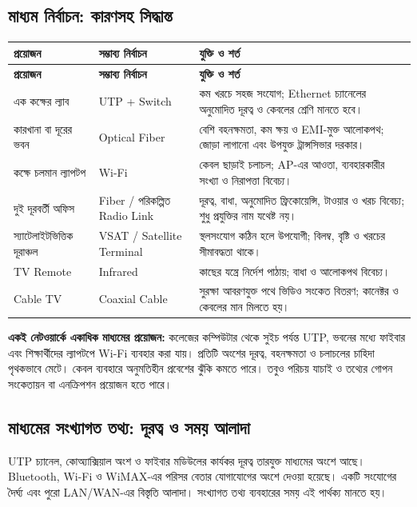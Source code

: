 \subsection{মাধ্যম নির্বাচন: কারণসহ সিদ্ধান্ত}
\begin{longtable}{|p{}|p{}|p{}|}
\hline
\textbf{প্রয়োজন} & \textbf{সম্ভাব্য নির্বাচন} & \textbf{যুক্তি ও শর্ত}\\\hline
\endfirsthead
\hline
\textbf{প্রয়োজন} & \textbf{সম্ভাব্য নির্বাচন} & \textbf{যুক্তি ও শর্ত}\\\hline
\endhead
এক কক্ষের ল্যাব & UTP + Switch & কম খরচে সহজ সংযোগ; Ethernet চ্যানেলের অনুমোদিত দূরত্ব ও কেবলের শ্রেণি মানতে হবে।\\\hline
কারখানা বা দূরের ভবন & Optical Fiber & বেশি বহনক্ষমতা, কম ক্ষয় ও EMI-মুক্ত আলোকপথ; জোড়া লাগানো এবং উপযুক্ত ট্রান্সসিভার দরকার।\\\hline
কক্ষে চলমান ল্যাপটপ & Wi-Fi & কেবল ছাড়াই চলাচল; AP-এর আওতা, ব্যবহারকারীর সংখ্যা ও নিরাপত্তা বিবেচ্য।\\\hline
দুই দূরবর্তী অফিস & Fiber / পরিকল্পিত Radio Link & দূরত্ব, বাধা, অনুমোদিত ফ্রিকোয়েন্সি, টাওয়ার ও খরচ বিবেচ্য; শুধু প্রযুক্তির নাম যথেষ্ট নয়।\\\hline
স্যাটেলাইটভিত্তিক দূরাঞ্চল & VSAT / Satellite Terminal & স্থলসংযোগ কঠিন হলে উপযোগী; বিলম্ব, বৃষ্টি ও খরচের সীমাবদ্ধতা থাকে।\\\hline
TV Remote & Infrared & কাছের যন্ত্রে নির্দেশ পাঠায়; বাধা ও আলোকপথ বিবেচ্য।\\\hline
Cable TV & Coaxial Cable & সুরক্ষা আবরণযুক্ত পথে ভিডিও সংকেত বিতরণ; কানেক্টর ও কেবলের মান মিলতে হয়।\\\hline
\end{longtable}
\textbf{একই নেটওয়ার্কে একাধিক মাধ্যমের প্রয়োজন:} কলেজের কম্পিউটার থেকে সুইচ পর্যন্ত UTP, ভবনের মধ্যে ফাইবার এবং শিক্ষার্থীদের ল্যাপটপে Wi-Fi ব্যবহার করা যায়। প্রতিটি অংশের দূরত্ব, বহনক্ষমতা ও চলাচলের চাহিদা পৃথকভাবে মেটে। কেবল ব্যবহারে অনুমতিহীন প্রবেশের ঝুঁকি কমতে পারে। তবুও পরিচয় যাচাই ও তথ্যের গোপন সংকেতায়ন বা এনক্রিপশন প্রয়োজন হতে পারে।


\subsection{মাধ্যমের সংখ্যাগত তথ্য: দূরত্ব ও সময় আলাদা}
UTP চ্যানেল, কোঅ্যাক্সিয়াল অংশ ও ফাইবার মডিউলের কার্যকর দূরত্ব তারযুক্ত মাধ্যমের অংশে আছে। Bluetooth, Wi-Fi ও WiMAX-এর পরিসর বেতার যোগাযোগের অংশে দেওয়া হয়েছে। একটি সংযোগের দৈর্ঘ্য এবং পুরো LAN/WAN-এর বিস্তৃতি আলাদা। সংখ্যাগত তথ্য ব্যবহারের সময় এই পার্থক্য মানতে হয়।
